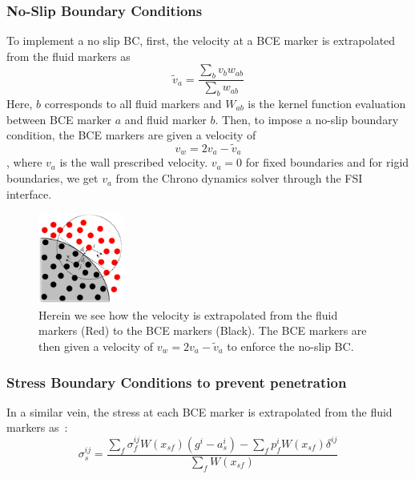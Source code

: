 \documentclass{article}
\begin{document}
\subsubsection*{No-Slip Boundary Conditions}
To implement a no slip BC, first, the velocity at a BCE marker is extrapolated from the fluid markers as
$$\tilde{v}_a = \frac{\sum_b v_b w_{ab}}{\sum_b w_{ab}}$$
Here, $b$ corresponds to all fluid markers and $W_{ab}$ is the kernel function evaluation between BCE marker $a$ and fluid marker $b$.  
Then, to impose a no-slip boundary condition, the BCE markers are given a velocity of
$$v_w = 2v_a - \tilde{v}_a$$, where $v_a$ is the wall prescribed velocity. $v_a = 0$ for fixed boundaries and for rigid boundaries, we get $v_a$ from the Chrono dynamics solver through the FSI interface.
\begin{figure}[h]
  \centering
  \includegraphics[width=0.25\textwidth]{./img/bc.png}
  \caption{Herein we see how the velocity is extrapolated from the fluid markers (Red) to the BCE markers (Black). The BCE markers are then given a velocity of $v_w = 2v_a - \tilde{v}_a$ to enforce the no-slip BC.}
  \label{fig:noSlipBC}
\end{figure}
\subsubsection*{Stress Boundary Conditions to prevent penetration}
In a similar vein, the stress at each BCE marker is extrapolated from the fluid markers as~\citep{StressBC}:
$$\sigma_s^{ij} = \frac{\sum_f \sigma_f^{ij} W(x_{sf}) \left( g^i - a_s^i \right) - \sum_f p_f^i W(x_{sf}) \delta^{ij}}{\sum_f W(x_{sf})}
$$
\end{document}
